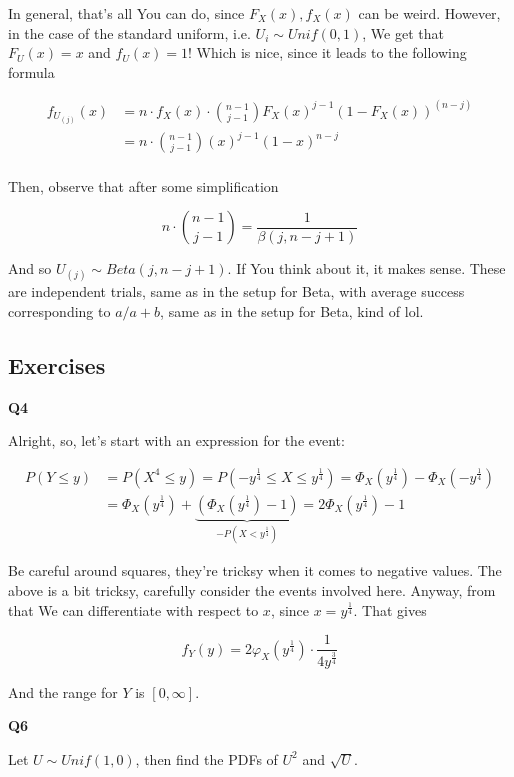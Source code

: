 \documentclass{article}
\begin{document}
		In general, that's all You can do, since $F_X(x), f_X(x)$ can be weird. However, in the case of the standard uniform, i.e. $U_i\sim Unif(0, 1)$, We get that $F_U(x) = x$ and $f_U(x)=1$! Which is nice, since it leads to the following formula
		
		\begin{align*}
		f_{U_{(j)}}(x) &= n\cdot f_X(x)\cdot {n-1\choose j-1}F_X(x)^{j-1}(1-F_X(x))^{(n-j)}\\
		&= n\cdot {n-1\choose j-1}(x)^{j-1}(1-x)^{n-j}\\
		\end{align*}
		
		Then, observe that after some simplification
		
		\[ n\cdot {n-1\choose j-1} = \frac{1}{\beta(j, n-j+1)} \]
		
		And so $U_{(j)}\sim Beta(j, n-j+1)$. If You think about it, it makes sense. These are independent trials, same as in the setup for Beta, with average success corresponding to $a/a+b$, same as in the setup for Beta, kind of lol.
		
	\subsection{Exercises}
	
		\textbf{Q4}
		
			Alright, so, let's start with an expression for the event:
			
			\begin{align*}
			P(Y\le y) &= P(X^4\le y) = P(-y^{\frac{1}{4}} \le X\le y^{\frac{1}{4}}) = \Phi_X(y^{\frac{1}{4}}) - \Phi_X(-y^{\frac{1}{4}})\\ 
			&= \Phi_X(y^{\frac{1}{4}}) + \underbrace{(\Phi_X(y^{\frac{1}{4}})-1)}_{-P(X<y^{\frac{1}{4}})} = 2\Phi_X(y^{\frac{1}{4}}) - 1
			\end{align*}
			
			Be careful around squares, they're tricksy when it comes to negative values. The above is a bit tricksy, carefully consider the events involved here. Anyway, from that We can differentiate with respect to $x$, since $x = y^{\frac{1}{4}}$. That gives
			
			\[f_Y(y) = 2\varphi_X(y^{\frac{1}{4}})\cdot \frac{1}{4y^{\frac{3}{4}}}\]
			
			And the range for $Y$ is $[0, \infty]$.
			
			\hfill
			
		\textbf{Q6}
		
			Let $U\sim Unif(1, 0)$, then find the PDFs of $U^2$ and $\sqrt{U}$.
			
\end{document}

